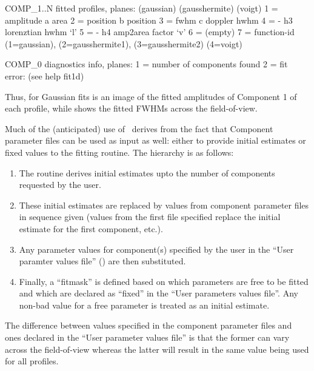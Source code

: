 \documentclass[oneside,11pt]{starlink}
\begin{document}
\begin{terminalv}
    COMP_1..N fitted profiles, planes:
               (gaussian)          (gausshermite)        (voigt)
         1 =   amplitude                a                 area
         2 =   position                 b               position
         3 =     fwhm                   c             doppler hwhm
         4 =       -                    h3           lorenztian hwhm `l'
         5 =       -                    h4           amp2area factor `v'
         6 =   (empty)
         7 = function-id (1=gaussian), (2=gausshermite1), (3=gausshermite2)
                         (4=voigt)

    COMP_0 diagnostics info, planes:
         1 = number of components found
         2 = fit error: (see help fit1d)
\end{terminalv}

Thus, for Gaussian fits  is
an image of the fitted amplitudes of Component 1 of each profile,
while  shows the fitted FWHMs
across the field-of-view.

Much of the (anticipated) use of \fitdd\ derives from the fact that
Component parameter files can be used as input as well: either to
provide initial estimates or fixed values to the fitting routine.
The hierarchy is as follows:
\begin{enumerate}
\item The routine derives initial estimates upto the number of components
requested by the user.
\item These initial estimates are replaced by values from component parameter
files in sequence given (values from the first file specified replace
the initial estimate for the first component, etc.).
\item Any parameter values for component(s) specified by the user in
the ``User paramter values file'' () are then substituted.
\item Finally, a ``fitmask'' is defined based on which parameters are
free to be fitted and which are declared as ``fixed'' in the ``User
parameters values file''. Any non-bad value for a free parameter is treated
as an initial estimate.
\end{enumerate}

The difference between values specified in the component parameter
files and ones declared in the ``User parameter values file'' is that
the former can vary across the field-of-view whereas the latter will
result in the same value being used for all profiles.
\end{document}
